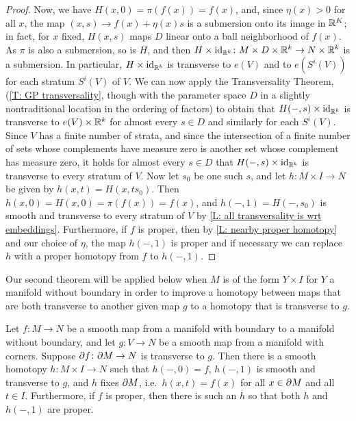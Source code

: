 \begin{proof}
	Now, we have $H(x,0) = \pi(f(x)) = f(x)$, and, since $\eta(x)>0$ for all $x$, the map $(x,s) \to f(x)+ \eta(x)s$ is a submersion onto its image in $\mathbb{R}^K$; in fact, for $x$ fixed, $H(x,s)$ maps $D$ linear onto a ball neighborhood of $f(x)$.
	As $\pi$ is also a submersion, so is $H$, and then $H \times \mathrm{id}_{\mathbb{R}^k} \colon M \times D \times \mathbb{R}^k \to N \times \mathbb{R}^k$ is a submersion.
	In particular, $H \times \mathrm{id}_{\mathbb{R}^k}$ is transverse to $e(V)$ and to $e(S^i(V))$ for each stratum $S^i(V)$ of $V$.
	We can now apply the Transversality Theorem, (\cref{T: GP transversality}, though with the parameter space $D$ in a slightly nontraditional location in the ordering of factors) to obtain that $H(-,s) \times \mathrm{id}_{\mathbb{R}^k}$ is transverse to $e(V) \times \mathbb{R}^k$ for almost every $s \in D$ and similarly for each $S^i(V)$.
	Since $V$ has a finite number of strata, and since the intersection of a finite number of sets whose complements have measure zero is another set whose complement has measure zero, it holds for almost every $s \in D$ that $H(-,s) \times \mathrm{id}_{\mathbb{R}^k}$ is transverse to every stratum of $V$.
	Now let $s_0$ be one such $s$, and let $h \colon M \times I \to N$ be given by $h(x,t) = H(x,ts_0)$.
	Then $h(x,0) = H(x,0) = \pi(f(x)) = f(x)$, and $h(-,1) = H(-,s_0)$ is smooth and transverse to every stratum of $V$ by \cref{L: all transversality is wrt embeddings}.
	Furthermore, if $f$ is proper, then by \cref{L: nearby proper homotopy} and our choice of $\eta$, the map $h(-,1)$ is proper and if necessary we can replace $h$ with a proper homotopy from $f$ to $h(-,1)$. \qedhere

	\begin{comment}
	If $f|_{\bd M}$ is already transverse to $g$, we modify the construction as follows: Let $\rho \colon M \to [0,1]$ be a smooth function that is $0$ on $\bd M$ and $>0$ on $M-\bd M$.
	Then we define
	$$H(x,s) = \pi(f(x)+ \epsilon(f(x))\rho(x)s).$$
	Then when $x \in \bd M$, we have $H(x,s) = \pi(f(x)) = f(x)$, so $h$ is constant along $\bd M$.
	For $x \notin \bd M$, the argument goes through exactly as above.
	\end{comment}
\end{proof}

Our second theorem will be applied below when $M$ is of the form $Y \times I$ for $Y$ a manifold without boundary in order to improve a homotopy between maps that are both transverse to another given map $g$ to a homotopy that is transverse to $g$.

\begin{theorem}\label{T: homotopy trans}
	Let $f \colon M \to N$ be a smooth map from a manifold with boundary to a manifold without boundary, and let $g \colon V \to N$ be a smooth map from a manifold with corners.
	Suppose $\partial f \colon \partial M \to N$ is transverse to $g$.
	Then there is a smooth homotopy $h \colon M \times I \to N$ such that $h(-,0) = f$, $h(-,1)$ is smooth and transverse to $g$, and $h$ fixes $\partial M$, i.e.\ $h(x,t)=f(x)$ for all $x \in \partial M$ and all $t \in I$.
	Furthermore, if $f$ is proper, then there is such an $h$ so that both $h$ and $h(-,1)$ are proper.
\end{theorem}

